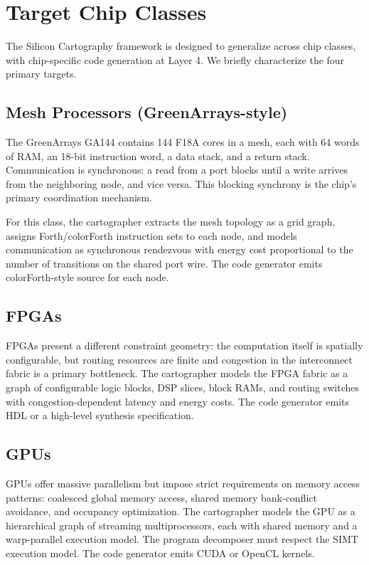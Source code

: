 \documentclass[11pt, a4paper]{article}
\begin{document}
\section{Target Chip Classes}

The Silicon Cartography framework is designed to generalize across chip classes,
with chip-specific code generation at Layer 4. We briefly characterize the four
primary targets.

\subsection{Mesh Processors (GreenArrays-style)}

The GreenArrays GA144 contains 144 F18A cores in a mesh, each with 64 words of RAM,
an 18-bit instruction word, a data stack, and a return stack. Communication is
synchronous: a read from a port blocks until a write arrives from the neighboring node,
and vice versa. This blocking synchrony is the chip's primary coordination mechanism.

For this class, the cartographer extracts the mesh topology as a grid graph, assigns
Forth/colorForth instruction sets to each node, and models communication as synchronous
rendezvous with energy cost proportional to the number of transitions on the shared
port wire. The code generator emits colorForth-style source for each node.

\subsection{FPGAs}

FPGAs present a different constraint geometry: the computation itself is spatially
configurable, but routing resources are finite and congestion in the interconnect
fabric is a primary bottleneck. The cartographer models the FPGA fabric as a graph
of configurable logic blocks, DSP slices, block RAMs, and routing switches with
congestion-dependent latency and energy costs. The code generator emits HDL or a
high-level synthesis specification.

\subsection{GPUs}

GPUs offer massive parallelism but impose strict requirements on memory access patterns:
coalesced global memory access, shared memory bank-conflict avoidance, and occupancy
optimization. The cartographer models the GPU as a hierarchical graph of streaming
multiprocessors, each with shared memory and a warp-parallel execution model. The
program decomposer must respect the SIMT execution model. The code generator emits
CUDA or OpenCL kernels.
\end{document}
